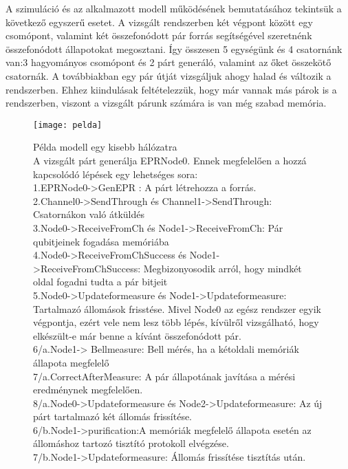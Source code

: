 A szimuláció és az alkalmazott modell működésének bemutatásához tekintsük a következő egyszerű esetet. A vizsgált rendszerben két végpont között egy csomópont, valamint két összefonódott pár forrás segítségével szeretnénk összefonódott állapotokat megosztani. Így összesen 5 egységünk és 4 csatornánk van:3 hagyományos csomópont és 2 párt generáló, valamint az őket összekötő csatornák. A továbbiakban egy pár útját vizsgáljuk ahogy halad és változik a rendszerben. Ehhez kiindulásak feltételezzük, hogy már vannak más párok is a rendszerben, viszont a vizsgált párunk számára is van még szabad memória.
\\
\begin{figure}
\centering
\texttt{[image: pelda]}
\caption[Példa modell egy kisebb hálózatra]{Példa modell egy kisebb hálózatra\\
A vizsgált párt generálja EPRNode0. Ennek megfelelően a hozzá kapcsolódó lépések egy lehetséges sora: \\
1.EPRNode0->GenEPR : A párt létrehozza a forrás.\\
2.Channel0->SendThrough és Channel1->SendThrough: Csatornákon való átküldés\\
3.Node0->ReceiveFromCh és Node1->ReceiveFromCh: Pár qubitjeinek fogadása memóriába\\
4.Node0->ReceiveFromChSuccess és Node1->ReceiveFromChSuccess: Megbizonyosodik arról, hogy mindkét oldal fogadni tudta a pár bitjeit\\
5.Node0->Updateformeasure és Node1->Updateformeasure: Tartalmazó állomások frisstése. Mivel Node0 az egész rendszer egyik végpontja, ezért vele nem lesz több lépés, kívülről vizsgálható, hogy elkészült-e már benne a kívánt összefonódott pár.\\
6/a.Node1-> Bellmeasure: Bell mérés, ha a kétoldali memóriák állapota megfelelő\\
7/a.CorrectAfterMeasure: A pár állapotának javítása a mérési eredménynek megfelelően.\\
8/a.Node0->Updateformeasure és Node2->Updateformeasure: Az új párt tartalmazó két állomás frissítése.\\
6/b.Node1->purification:A memóriák megfelelő állapota esetén az állomáshoz tartozó tisztító protokoll elvégzése.\\
7/b.Node1->Updateformeasure: Állomás frissítése tisztítás után.
}
\end{figure}
\\
